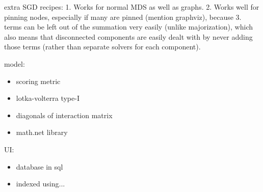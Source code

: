 extra SGD recipes: 1. Works for normal MDS as well as graphs. 2. Works well for pinning nodes, especially if many are pinned (mention graphviz), because 3. terms can be left out of the summation very easily (unlike majorization), which also means that disconnected components are easily dealt with by never adding those terms (rather than separate solvers for each component).

model:
\begin{itemize}
    \item scoring metric

    \item lotka-volterra type-I
    \item diagonals of interaction matrix
    \item math.net library
\end{itemize}

UI:
\begin{itemize}
    \item database in sql
    \item indexed using...
\end{itemize}
